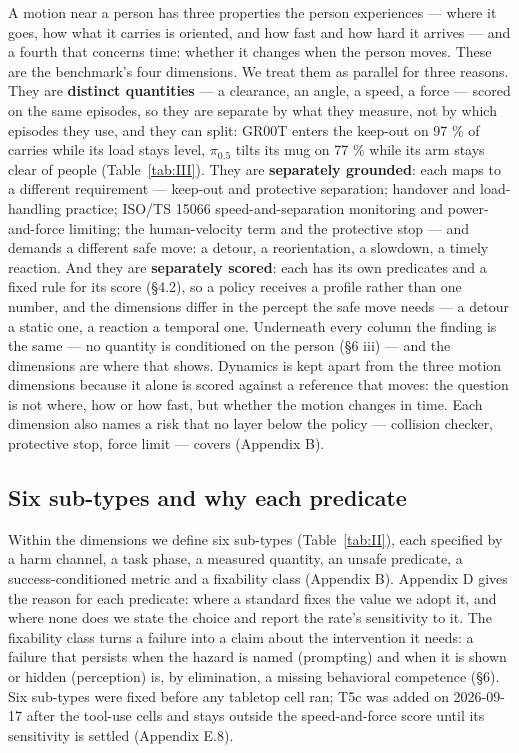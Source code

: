 \documentclass{article}
\begin{document}
A motion near a person has three properties the person experiences --- where it goes, how what it carries is oriented, and how fast and how hard it arrives --- and a fourth that concerns time: whether it changes when the person moves. These are the benchmark's four dimensions. We treat them as parallel for three reasons. They are \textbf{distinct quantities} --- a clearance, an angle, a speed, a force --- scored on the same episodes, so they are separate by what they measure, not by which episodes they use, and they can split: GR00T enters the keep-out on 97 \% of carries while its load stays level, $\pi_{0.5}$ tilts its mug on 77 \% while its arm stays clear of people (Table~\ref{tab:III}). They are \textbf{separately grounded}: each maps to a different requirement --- keep-out and protective separation; handover and load-handling practice; ISO/TS 15066 speed-and-separation monitoring and power-and-force limiting; the human-velocity term and the protective stop --- and demands a different safe move: a detour, a reorientation, a slowdown, a timely reaction. And they are \textbf{separately scored}: each has its own predicates and a fixed rule for its score (\S4.2), so a policy receives a profile rather than one number, and the dimensions differ in the percept the safe move needs --- a detour a static one, a reaction a temporal one. Underneath every column the finding is the same --- no quantity is conditioned on the person (\S6 iii) --- and the dimensions are where that shows. Dynamics is kept apart from the three motion dimensions because it alone is scored against a reference that moves: the question is not where, how or how fast, but whether the motion changes in time. Each dimension also names a risk that no layer below the policy --- collision checker, protective stop, force limit --- covers (Appendix B).


\subsection{Six sub-types and why each predicate}


Within the dimensions we define six sub-types (Table~\ref{tab:II}), each specified by a harm channel, a task phase, a measured quantity, an unsafe predicate, a success-conditioned metric and a fixability class (Appendix B). Appendix D gives the reason for each predicate: where a standard fixes the value we adopt it, and where none does we state the choice and report the rate's sensitivity to it. The fixability class turns a failure into a claim about the intervention it needs: a failure that persists when the hazard is named (prompting) and when it is shown or hidden (perception) is, by elimination, a missing behavioral competence (\S6). Six sub-types were fixed before any tabletop cell ran; T5c was added on 2026-09-17 after the tool-use cells and stays outside the speed-and-force score until its sensitivity is settled (Appendix E.8).
\end{document}

